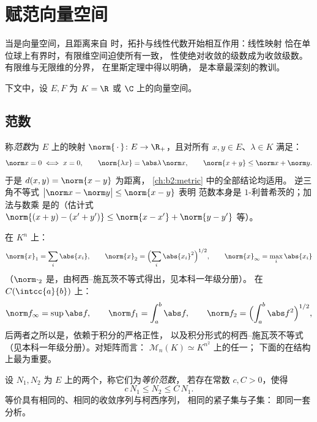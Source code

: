\chapter{赋范向量空间}\label{ch:b2:nvs}

当是向量空间，且距离来自
时，拓扑与线性代数开始相互作用：线性映射
恰在单位球上有界时，有限维空间迫使所有一致，
性使绝对收敛的级数成为收敛级数。
有限维与无限维的分界，
在里斯定理中得以明确，
是本章最深刻的教训。

下文中，设 $E, F$ 为 $K = \R$ 或 $\C$ 上的向量空间。

\section{范数}

\begin{definition}\label{def:b2:nvs:norm}
称\emph{范数}为 $E$ 上的映射 $\norm{\,\cdot\,} \colon E
\to \R_+$，且对所有 $x, y \in E$、$\lambda \in K$ 满足：
\[
\norm x = 0 \iff x = 0,
\qquad
\norm{\lambda x} = \abs\lambda\,\norm x,
\qquad
\norm{x + y} \leq \norm x + \norm y .
\]
于是 $d(x, y) = \norm{x - y}$ 为距离，
\cref{ch:b2:metric} 中的全部结论均适用。
逆三角不等式 $\bigl|\norm x - \norm y\bigr| \leq \norm{x - y}$ 表明
范数本身是 $1$-利普希茨的；加法与数乘
是的（估计式 $\norm{(x + y) - (x' + y')} \leq \norm{x -
x'} + \norm{y - y'}$ 等）。
\end{definition}

\begin{example}\label{ex:b2:nvs:examples}
在 $K^n$ 上：
\[
\norm{x}_1 = \sum_i \abs{x_i},
\qquad
\norm{x}_2 = \Bigl(\sum_i \abs{x_i}^2\Bigr)^{1/2},
\qquad
\norm{x}_\infty = \max_i \abs{x_i}
\]
（$\norm\cdot_2$ 是，由柯西–施瓦茨不等式得出，见本科一年级分册）。
在 $C(\intcc{a}{b})$ 上：
\[
\norm f_\infty = \sup \abs f,
\qquad
\norm f_1 = \int_a^b \abs f,
\qquad
\norm f_2 = \Bigl(\int_a^b \abs f^2\Bigr)^{1/2},
\]
后两者之所以是，依赖于积分的严格正性，
以及积分形式的柯西–施瓦茨不等式（见本科一年级分册）。对矩阵而言：
$\mathcal M_n(K) \simeq K^{n^2}$ 上的任一；
下面的在结构上最为重要。
\end{example}

\begin{definition}[等价范数]\label{def:b2:nvs:equivalent}
设 $N_1, N_2$ 为 $E$ 上的两个，称它们为\emph{等价范数}，
若存在常数 $c, C > 0$，使得
\[
c\,N_1 \leq N_2 \leq C\, N_1 .
\]
等价具有相同的、相同的收敛序列与柯西序列，
相同的紧子集与子集：
即同一套分析。
\end{definition}

